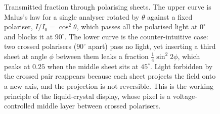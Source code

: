 \begin{figure}[htbp]
\centering
{}
\caption[Malus's law and a three-sheet stack]{Transmitted fraction through
polarising sheets. The upper curve is Malus's law for a single analyser rotated
by $\theta$ against a fixed polariser, $I/I_0=\cos^2\theta$, which passes all
the polarised light at $0^{\circ}$ and blocks it at $90^{\circ}$. The lower
curve is the counter-intuitive case: two crossed polarisers ($90^{\circ}$
apart) pass no light, yet inserting a third sheet at angle $\phi$ between them
leaks a fraction $\tfrac14\sin^2 2\phi$, which peaks at $0.25$ when the middle
sheet sits at $45^{\circ}$. Light forbidden by the crossed pair reappears
because each sheet projects the field onto a new axis, and the projection is not
reversible. This is the working principle of the liquid-crystal display, whose
pixel is a voltage-controlled middle layer between crossed polarisers.}
\label{fig:vol04ch11:malus-stack}
\end{figure}
